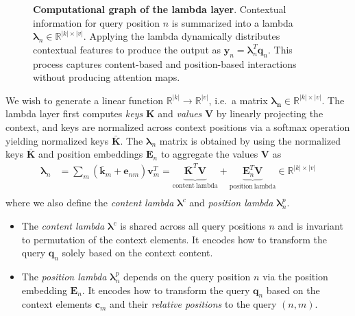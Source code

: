 \documentclass{article} \usepackage{iclr2021_conference,times}
\begin{document}
\begin{figure}[t]
\begin{subfigure}{0.35\textwidth}
\begin{tabular}{ll}
        \bottomrule
        \end{tabular}
        \label{tab:lambda_layer_quantities}
    \end{subfigure}
    \caption{
    \textbf{Computational graph of the lambda layer}. 
    Contextual information for query position $n$ is summarized into a lambda $\boldsymbol{\lambda}_n \in \mathbb{R}^{|k|\times|v|}$.
    Applying the lambda dynamically distributes contextual features to produce the output as $\boldsymbol{y}_n= \boldsymbol{\lambda}^T_n \boldsymbol{q}_n$.
    This process captures content-based and position-based interactions without producing attention maps.}
    \label{fig:lambda_layer_graph}
\end{figure}

We wish to generate a linear function $\mathbb{R}^{|k|} \rightarrow \mathbb{R}^{|v|}$, i.e.\ a matrix $\boldsymbol{\lambda_n} \in \mathbb{R}^{|k|\times|v|}$.
The lambda layer first computes \emph{keys} $\boldsymbol{K}$ and \emph{values} $\boldsymbol{V}$ by linearly projecting the context, and keys are normalized across context positions via a softmax operation yielding normalized keys $\bar{\boldsymbol{K}}$.
The $\boldsymbol{\lambda}_n$ matrix is obtained by using the normalized keys $\bar{\boldsymbol{K}}$ and position embeddings $\boldsymbol{E}_n$ to aggregate the values $\boldsymbol{V}$ as
\begin{equation}
\begin{split}
    \label{eq:generating_lambdas}
    \boldsymbol{\lambda}_n &= \sum_{m} (\bar{\boldsymbol{k}}_m + \boldsymbol{e}_{nm})
    \boldsymbol{v}_m^T = \underbrace{\bar{\boldsymbol{K}_{}}^T \boldsymbol{V}}_{\textrm{content}\:\textrm{lambda}}+ \underbrace{\boldsymbol{E}_n^T \boldsymbol{V}}_{\textrm{position}\:\textrm{lambda}}
    \in \mathbb{R}^{|k|\times|v|} \\
\end{split}
\end{equation}
where we also define the \emph{content lambda} $\boldsymbol{\lambda}^c$ and \emph{position lambda} $\boldsymbol{\lambda}_n^p$.
\begin{itemize}
    \item The \emph{content lambda} $\boldsymbol{\lambda}^c$ is shared across all query positions $n$ and is invariant to permutation of the context elements. It encodes how to transform the query $\boldsymbol{q}_n$ solely based on the context content.
    \item The \emph{position lambda} $\boldsymbol{\lambda}_n^p$ depends on the query position $n$ via the position embedding $\boldsymbol{E}_n$. It encodes how to transform the query $\boldsymbol{q}_n$ based on the context elements $\boldsymbol{c}_m$ and their \emph{relative positions} to the query $(n, m)$.
\end{itemize}
\end{document}
